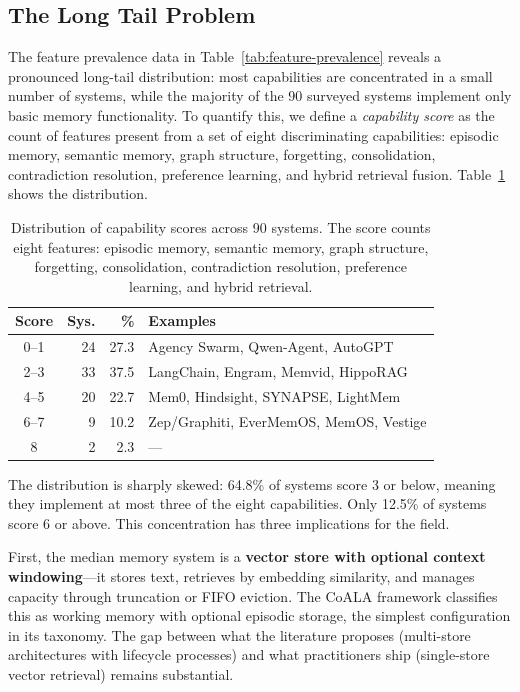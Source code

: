 \subsection{The Long Tail Problem}
\label{sec:long-tail}

The feature prevalence data in Table~\ref{tab:feature-prevalence} reveals a
pronounced long-tail distribution: most capabilities are concentrated in a
small number of systems, while the majority of the 90 surveyed systems
implement only basic memory functionality. To quantify this, we define a
\emph{capability score} as the count of features present from a set of eight
discriminating capabilities: episodic memory, semantic memory, graph structure,
forgetting, consolidation, contradiction resolution, preference learning, and
hybrid retrieval fusion. Table~\ref{tab:capability-distribution} shows the
distribution.

\begin{table}[!t]
\centering
\caption{Distribution of capability scores across 90 systems.  The score counts eight features: episodic memory, semantic memory, graph structure, forgetting, consolidation, contradiction resolution, preference learning, and hybrid retrieval.}
\label{tab:capability-distribution}
\small
\begin{tabular}{@{}crrp{3.8cm}@{}}
\toprule
\textbf{Score} & \textbf{Sys.} & \textbf{\%} & \textbf{Examples} \\
\midrule
0--1 & 24 & 27.3 & Agency Swarm, Qwen-Agent, AutoGPT \\
2--3 & 33 & 37.5 & LangChain, Engram, Memvid, HippoRAG \\
4--5 & 20 & 22.7 & Mem0, Hindsight, SYNAPSE, LightMem \\
6--7 &  9 & 10.2 & Zep/Graphiti, EverMemOS, MemOS, Vestige \\
8    &  2 &  2.3 & --- \\
\bottomrule
\end{tabular}
\end{table}

The distribution is sharply skewed: 64.8\% of systems score 3 or below,
meaning they implement at most three of the eight capabilities. Only 12.5\% of
systems score 6 or above. This concentration has three implications for the
field.

First, the median memory system is a \textbf{vector store with optional
context windowing}---it stores text, retrieves by embedding similarity, and
manages capacity through truncation or FIFO eviction. The CoALA framework
\cite{sumers2024coala} classifies this as working memory with optional
episodic storage, the simplest configuration in its taxonomy. The gap between
what the literature proposes (multi-store architectures with lifecycle
processes) and what practitioners ship (single-store vector retrieval) remains
substantial.

